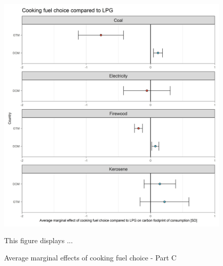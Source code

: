 \documentclass[12pt, a4paper]{article}
\newenvironment{subcaption}
{\strut
\vspace{-5pt}
\begin{minipage}[b]{0.9\textwidth}
  \hspace*{-\parindent}
  \footnotesize}
 {\end{minipage}}
\begin{document}
\begin{figure}[ht!]
  \centering
 \caption{Average marginal effects of cooking fuel choice - Part C} \label{fig:D8_LPG}
  \includegraphics{Analysis_OLS_ME_Carbon_Footprint/AME_OLS_FP_CF_LPG}
  \begin{subcaption}
    This figure displays ...
  \end{subcaption}

\end{figure}

\clearpage
\end{document}
